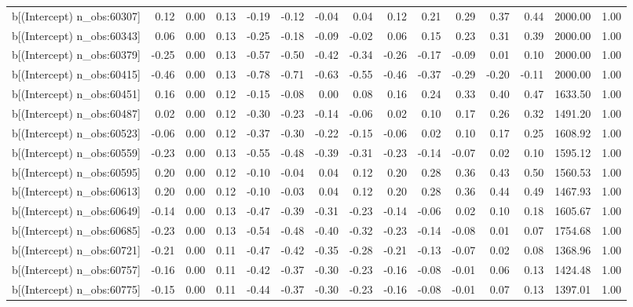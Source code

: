 \begin{table}[ht]
\begin{tabular}{rrrrrrrrrrrrrrr}
  b[(Intercept) n\_obs:60307] & 0.12 & 0.00 & 0.13 & -0.19 & -0.12 & -0.04 & 0.04 & 0.12 & 0.21 & 0.29 & 0.37 & 0.44 & 2000.00 & 1.00 \\ 
  b[(Intercept) n\_obs:60343] & 0.06 & 0.00 & 0.13 & -0.25 & -0.18 & -0.09 & -0.02 & 0.06 & 0.15 & 0.23 & 0.31 & 0.39 & 2000.00 & 1.00 \\ 
  b[(Intercept) n\_obs:60379] & -0.25 & 0.00 & 0.13 & -0.57 & -0.50 & -0.42 & -0.34 & -0.26 & -0.17 & -0.09 & 0.01 & 0.10 & 2000.00 & 1.00 \\ 
  b[(Intercept) n\_obs:60415] & -0.46 & 0.00 & 0.13 & -0.78 & -0.71 & -0.63 & -0.55 & -0.46 & -0.37 & -0.29 & -0.20 & -0.11 & 2000.00 & 1.00 \\ 
  b[(Intercept) n\_obs:60451] & 0.16 & 0.00 & 0.12 & -0.15 & -0.08 & 0.00 & 0.08 & 0.16 & 0.24 & 0.33 & 0.40 & 0.47 & 1633.50 & 1.00 \\ 
  b[(Intercept) n\_obs:60487] & 0.02 & 0.00 & 0.12 & -0.30 & -0.23 & -0.14 & -0.06 & 0.02 & 0.10 & 0.17 & 0.26 & 0.32 & 1491.20 & 1.00 \\ 
  b[(Intercept) n\_obs:60523] & -0.06 & 0.00 & 0.12 & -0.37 & -0.30 & -0.22 & -0.15 & -0.06 & 0.02 & 0.10 & 0.17 & 0.25 & 1608.92 & 1.00 \\ 
  b[(Intercept) n\_obs:60559] & -0.23 & 0.00 & 0.13 & -0.55 & -0.48 & -0.39 & -0.31 & -0.23 & -0.14 & -0.07 & 0.02 & 0.10 & 1595.12 & 1.00 \\ 
  b[(Intercept) n\_obs:60595] & 0.20 & 0.00 & 0.12 & -0.10 & -0.04 & 0.04 & 0.12 & 0.20 & 0.28 & 0.36 & 0.43 & 0.50 & 1560.53 & 1.00 \\ 
  b[(Intercept) n\_obs:60613] & 0.20 & 0.00 & 0.12 & -0.10 & -0.03 & 0.04 & 0.12 & 0.20 & 0.28 & 0.36 & 0.44 & 0.49 & 1467.93 & 1.00 \\ 
  b[(Intercept) n\_obs:60649] & -0.14 & 0.00 & 0.13 & -0.47 & -0.39 & -0.31 & -0.23 & -0.14 & -0.06 & 0.02 & 0.10 & 0.18 & 1605.67 & 1.00 \\ 
  b[(Intercept) n\_obs:60685] & -0.23 & 0.00 & 0.13 & -0.54 & -0.48 & -0.40 & -0.32 & -0.23 & -0.14 & -0.08 & 0.01 & 0.07 & 1754.68 & 1.00 \\ 
  b[(Intercept) n\_obs:60721] & -0.21 & 0.00 & 0.11 & -0.47 & -0.42 & -0.35 & -0.28 & -0.21 & -0.13 & -0.07 & 0.02 & 0.08 & 1368.96 & 1.00 \\ 
  b[(Intercept) n\_obs:60757] & -0.16 & 0.00 & 0.11 & -0.42 & -0.37 & -0.30 & -0.23 & -0.16 & -0.08 & -0.01 & 0.06 & 0.13 & 1424.48 & 1.00 \\ 
  b[(Intercept) n\_obs:60775] & -0.15 & 0.00 & 0.11 & -0.44 & -0.37 & -0.30 & -0.23 & -0.16 & -0.08 & -0.01 & 0.07 & 0.13 & 1397.01 & 1.00 \\ 

\end{tabular}
\end{table}
